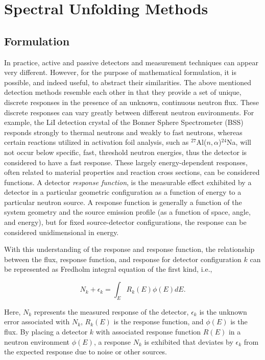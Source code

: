 \section{Spectral Unfolding Methods}


\subsection{Formulation}


In practice, active and passive detectors and measurement techniques can appear very different.
However, for the purpose of mathematical formulation, it is possible, and indeed useful, to abstract their similarities.
The above mentioned detection methods resemble each other in that they provide a set of unique, discrete responses in the presence of an unknown, continuous neutron flux.
These discrete responses can vary greatly between different neutron environments.
For example, the LiI detection crystal of the Bonner Sphere Spectrometer (BSS) responds strongly to thermal neutrons and weakly to fast neutrons, whereas certain reactions utilized in activation foil analysis, such as $^{27}$Al($n, \alpha$)$^{24}$Na, will not occur below specific, fast, threshold neutron energies, thus the detector is considered to have a fast response.
These largely energy-dependent responses, often related to material properties and reaction cross sections, can be considered functions.
A detector {\it response function}, is the measurable effect exhibited by a detector in a particular geometric configuration as a function of energy to a particular neutron source.
A response function is generally a function of the system geometry and the source emission profile (as a function of space, angle, and energy), but for fixed source-detector configurations, the response can be considered unidimensional in energy.

With this understanding of the response and response function, the relationship between the flux, response function, and response for detector configuration $k$ can be represented as Fredholm integral equation of the first kind, i.e.,

\begin{equation}
\label{eqn:cont-response}
N_k + \epsilon_k = \int_E R_k(E) \phi(E) dE .
\end{equation}

\noindent
Here, $N_k$ represents the measured response of the detector, $\epsilon_k$ is the unknown error associated with $N_k$, $R_k(E)$ is the response function, and $\phi(E)$ is the flux.
By placing a detector $k$ with associated response function $R(E)$ in a neutron environment $\phi(E)$, a response $N_k$ is exhibited that deviates by $\epsilon_k$ from the expected response due to noise or other sources.

